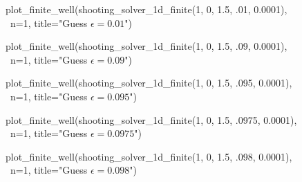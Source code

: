 \documentclass{article}
\begin{document}
\begin{figure}[H]
\begin{sageblock}
plot_finite_well(shooting_solver_1d_finite(1, 0, 1.5, .01, 0.0001), \
                      n=1, title="Guess $\epsilon=0.01$")
\end{sageblock}
\vspace{-.1in}
\centering
{}
\end{figure}
\vspace{-.2in}
\begin{figure}[H]
\begin{sageblock}
plot_finite_well(shooting_solver_1d_finite(1, 0, 1.5, .09, 0.0001), \
                      n=1, title="Guess $\epsilon=0.09$")
\end{sageblock}
\vspace{-.1in}
\centering
{}
\end{figure}
\vspace{-.2in}
\begin{figure}[H]
\begin{sageblock}
plot_finite_well(shooting_solver_1d_finite(1, 0, 1.5, .095, 0.0001), \
                      n=1, title="Guess $\epsilon=0.095$")
\end{sageblock}
\vspace{-.1in}
\centering
{}
\end{figure}
\vspace{-.2in}
\begin{figure}[H]
\begin{sageblock}
plot_finite_well(shooting_solver_1d_finite(1, 0, 1.5, .0975, 0.0001), \
                      n=1, title="Guess $\epsilon=0.0975$")
\end{sageblock}
\vspace{-.1in}
\centering
{}
\end{figure}
\vspace{-.2in}
\begin{figure}[H]
\begin{sageblock}
plot_finite_well(shooting_solver_1d_finite(1, 0, 1.5, .098, 0.0001), \
                      n=1, title="Guess $\epsilon=0.098$")
\end{sageblock}
\vspace{-.1in}
\centering
{}
\end{figure}
\end{document}
